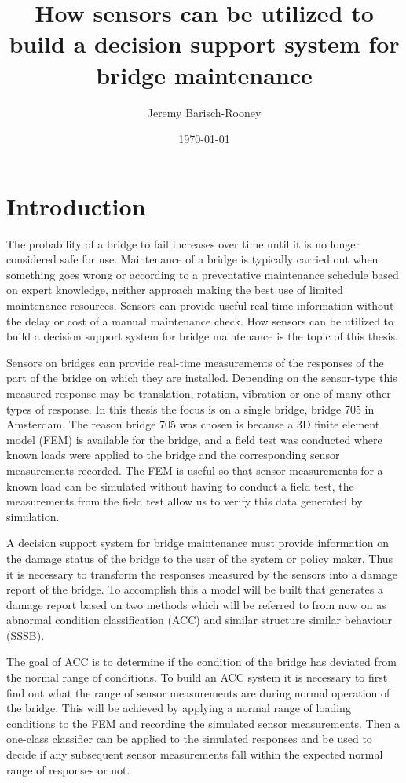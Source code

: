 \documentclass[11pt]{article}
\author{Jeremy Barisch-Rooney}
\date{\today}
\title{How sensors can be utilized to build a decision support system for bridge maintenance}
\begin{document}
\maketitle
\tableofcontents


\section{Introduction}
\label{sec:org5bf375e}
The probability of a bridge to fail increases over time until it is no longer
considered safe for use. Maintenance of a bridge is typically carried out
when something goes wrong or according to a preventative maintenance schedule
based on expert knowledge, neither approach making the best use of limited
maintenance resources. Sensors can provide useful real-time information
without the delay or cost of a manual maintenance check. How sensors can be
utilized to build a decision support system for bridge maintenance is the
topic of this thesis.

Sensors on bridges can provide real-time measurements of the responses of the
part of the bridge on which they are installed. Depending on the sensor-type
this measured response may be translation, rotation, vibration or one of many
other types of response. In this thesis the focus is on a single bridge,
bridge 705 in Amsterdam. The reason bridge 705 was chosen is because a 3D
finite element model (FEM) is available for the bridge, and a field test was
conducted where known loads were applied to the bridge and the corresponding
sensor measurements recorded. The FEM is useful so that sensor measurements
for a known load can be simulated without having to conduct a field test, the
measurements from the field test allow us to verify this data generated by
simulation.

A decision support system for bridge maintenance must provide information on
the damage status of the bridge to the user of the system or policy maker.
Thus it is necessary to transform the responses measured by the sensors into
a damage report of the bridge. To accomplish this a model will be built that
generates a damage report based on two methods which will be referred to from
now on as abnormal condition classification (ACC) and similar structure
similar behaviour (SSSB).

The goal of ACC is to determine if the condition of the bridge has deviated
from the normal range of conditions. To build an ACC system it is necessary
to first find out what the range of sensor measurements are during normal
operation of the bridge. This will be achieved by applying a normal range of
loading conditions to the FEM and recording the simulated sensor
measurements. Then a one-class classifier can be applied to the simulated
responses and be used to decide if any subsequent sensor measurements fall
within the expected normal range of responses or not.
\end{document}
